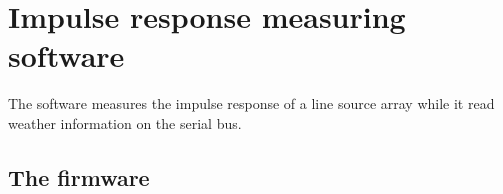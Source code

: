 \chapter{Impulse response measuring software}\label{ap:imp_res_meas_soft}
The software measures the impulse response of a line source array while it read weather information on the serial bus.


\section*{The firmware}




